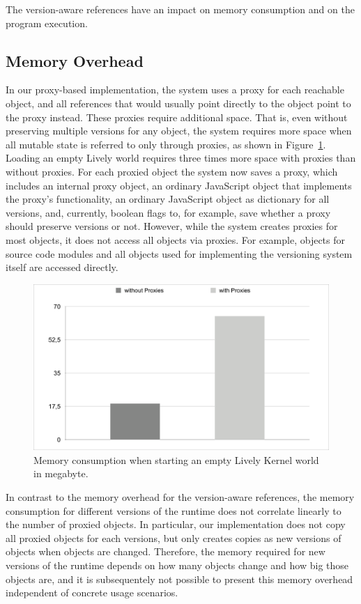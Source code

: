 The version-aware references have an impact on memory consumption and on the program execution.

\subsection{Memory Overhead}

In our proxy-based implementation, the system uses a proxy for each reachable object, and all references that would usually point directly to the object point to the proxy instead.
These proxies require additional space.
That is, even without preserving multiple versions for any object, the system requires more space when all mutable state is referred to only through proxies, as shown in Figure~\ref{fig:MemoryOverhead}.
Loading an empty Lively world requires three times more space with proxies than without proxies.
For each proxied object the system now saves a proxy, which includes an internal proxy object, an ordinary JavaScript object that implements the proxy's functionality, an ordinary JavaScript object as dictionary for all versions, and, currently, boolean flags to, for example, save whether a proxy should preserve versions or not.
However, while the system creates proxies for most objects, it does not access all objects via proxies.
For example, objects for source code modules and all objects used for implementing the versioning system itself are accessed directly. 

\begin{figure}[h]
    \centering
    \includegraphics[width=\textwidth]{figures/memoryOverhead.pdf}
    \caption{Memory consumption when starting an empty Lively Kernel world in megabyte.}
    \label{fig:MemoryOverhead}
\end{figure}

In contrast to the memory overhead for the version-aware references, the memory consumption for different versions of the runtime does not correlate linearly to the number of proxied objects.
In particular, our implementation does not copy all proxied objects for each versions, but only creates copies as new versions of objects when objects are changed.
Therefore, the memory required for new versions of the runtime depends on how many objects change and how big those objects are, and it is subsequentely not possible to present this memory overhead independent of concrete usage scenarios.


